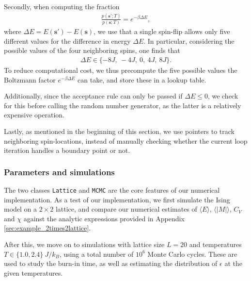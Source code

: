 \documentclass[english,notitlepage,reprint]{revtex4-2}  %
\renewcommand{\vec}[1]{\mathbf{#1}}
\begin{document}
Secondly, when computing the fraction 
\begin{align}
    \frac{p(\vec{s'}; T)}{p(\vec{s}; T)} = e^{-\beta \Delta E}, 
\end{align}
where \(\Delta E = E(\vec{s'}) - E(\vec{s})\), we use that a single spin-flip allows only five different values for the difference in energy \(\Delta E\).
In particular, considering the possible values of the four neighboring spins, one finds that 
\begin{align}
    \Delta E\in\{-8J,\ -4J,\ 0,\ 4J,\ 8J\}.
\end{align}
To reduce computational cost, we thus precompute the five possible values the Boltzmann factor \(e^{-\beta \Delta E}\) can take, and store these in a lookup table.

Additionally, since the acceptance rule can only be passed if \(\Delta E\leq 0\), we check for this before calling the random number generator, as the latter is a relatively expensive operation.

Lastly, as mentioned in the beginning of this section, we use pointers to track neighboring spin-locations, instead of manually checking whether the current loop iteration handles a boundary point or not. 








\subsubsection{Parameters and simulations}
The two classes \texttt{Lattice} and \texttt{MCMC} are the core features of our numerical implementation. 
As a test of our implementation, we first simulate the Ising model on a \(2\times 2\) lattice, and compare our numerical estimates of \(\langle E\rangle\), \(\langle |M|\rangle\), \(C_V\) and \(\chi\) against the analytic expressions provided in Appendix \ref{sec:example_2times2lattice}.

After this, we move on to simulations with lattice size $L=20$ and temperatures \(T\in\{1.0, 2.4\}\ \si{J/k_B}\), using a total number of \(10^6\) Monte Carlo cycles.
These are used to study the burn-in time, as well as estimating the distribution of \(\epsilon\) at the given temperatures.
\end{document}
